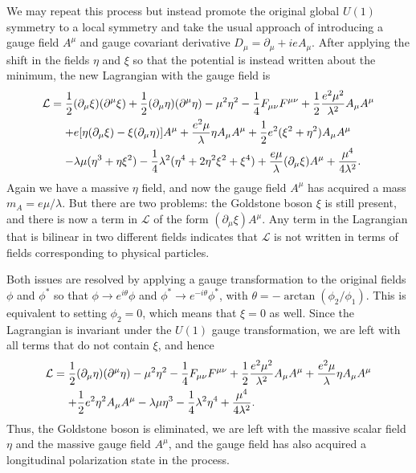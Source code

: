 We may repeat this process but instead promote the original global $U(1)$ symmetry to a local symmetry and take the usual approach of introducing a gauge field $A^\mu$ and gauge covariant derivative $D_\mu=\partial_\mu+ieA_\mu$.
After applying the shift in the fields $\eta$ and $\xi$ so that the potential is instead written about the minimum, the new Lagrangian with the gauge field is
\begin{equation}
  \begin{aligned}
    \mathcal{L} &= \frac{1}{2}(\partial_\mu\xi)(\partial^\mu\xi)+\frac{1}{2}(\partial_\mu\eta)(\partial^\mu\eta)-\mu^2\eta^2-\frac{1}{4}F_{\mu\nu}F^{\mu\nu}+\frac{1}{2}\frac{e^2\mu^2}{\lambda^2}A_\mu A^\mu\\
    &\equad+ e[\eta(\partial_\mu\xi)-\xi(\partial_\mu\eta)]A^\mu+\frac{e^2\mu}{\lambda}\eta A_\mu A^\mu+\frac{1}{2}e^2(\xi^2+\eta^2)A_\mu A^\mu\\
    &\equad- \lambda\mu(\eta^3+\eta\xi^2)-\frac{1}{4}\lambda^2(\eta^4+2\eta^2\xi^2+\xi^4)+\frac{e\mu}{\lambda}(\partial_\mu\xi)A^\mu+\frac{\mu^4}{4\lambda^2}.
  \end{aligned}
\end{equation}
Again we have a massive $\eta$ field, and now the gauge field $A^\mu$ has acquired a mass $m_A=e\mu/\lambda$.
But there are two problems: the Goldstone boson $\xi$ is still present, and there is now a term in $\mathcal{L}$ of the form $(\partial_\mu\xi)A^\mu$.
Any term in the Lagrangian that is bilinear in two different fields indicates that $\mathcal{L}$ is not written in terms of fields corresponding to physical particles.

Both issues are resolved by applying a gauge transformation to the original fields $\phi$ and $\phi^*$ so that $\phi\to e^{i\theta}\phi$ and $\phi^*\to e^{-i\theta}\phi^*$, with $\theta=-\arctan(\phi_2/\phi_1)$.
This is equivalent to setting $\phi_2=0$, which means that $\xi=0$ as well.
Since the Lagrangian is invariant under the $U(1)$ gauge transformation, we are left with all terms that do not contain $\xi$, and hence
\begin{equation}
  \begin{aligned}
    \mathcal{L} &= \frac{1}{2}(\partial_\mu\eta)(\partial^\mu\eta)-\mu^2\eta^2-\frac{1}{4}F_{\mu\nu}F^{\mu\nu}+\frac{1}{2}\frac{e^2\mu^2}{\lambda^2}A_\mu A^\mu+\frac{e^2\mu}{\lambda}\eta A_\mu A^\mu\\
    &\equad+ \frac{1}{2}e^2\eta^2A_\mu A^\mu-\lambda\mu\eta^3-\frac{1}{4}\lambda^2\eta^4+\frac{\mu^4}{4\lambda^2}.
  \end{aligned}
\end{equation}
Thus, the Goldstone boson is eliminated, we are left with the massive scalar field $\eta$ and the massive gauge field $A^\mu$, and the gauge field has also acquired a longitudinal polarization state in the process.

